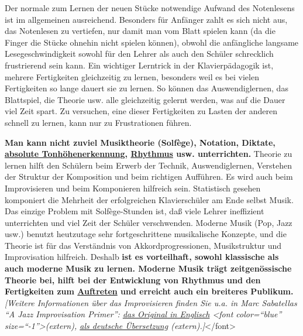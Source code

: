 Der normale zum Lernen der neuen Stücke notwendige Aufwand des Notenlesens ist im allgemeinen ausreichend.
Besonders für Anfänger zahlt es sich nicht aus, das Notenlesen zu vertiefen, nur damit man vom Blatt spielen kann (da die Finger die Stücke ohnehin nicht spielen können), obwohl die anfängliche langsame Lesegeschwindigkeit sowohl für den Lehrer als auch den Schüler schrecklich frustrierend sein kann.
Ein wichtiger Lerntrick in der Klavierpädagogik ist, mehrere Fertigkeiten gleichzeitig zu lernen, besonders weil es bei vielen Fertigkeiten so lange dauert sie zu lernen.
So können das Auswendiglernen, das Blattspiel, die Theorie usw. alle gleichzeitig gelernt werden, was auf die Dauer viel Zeit spart.
Zu versuchen, eine dieser Fertigkeiten zu Lasten der anderen schnell zu lernen, kann nur zu Frustrationen führen.

\textbf{Man kann nicht zuviel Musiktheorie (Solfège), Notation, Diktate, \hyperref[c1iii12]{absolute Tonhöhenerkennung}, \hyperref[c1iii1b]{Rhythmus} usw. unterrichten.}
Theorie zu lernen hilft den Schülern beim Erwerb der Technik, Auswendiglernen, Verstehen der Struktur der Komposition und beim richtigen Aufführen.
Es wird auch beim Improvisieren und beim Komponieren hilfreich sein.
Statistisch gesehen komponiert die Mehrheit der erfolgreichen Klavierschüler am Ende selbst Musik.
Das einzige Problem mit Solfège-Stunden ist, daß viele Lehrer ineffizient unterrichten und viel Zeit der Schüler verschwenden.
Moderne Musik (Pop, Jazz usw.) benutzt heutzutage sehr fortgeschrittene musikalische Konzepte, und die Theorie ist für das Verständnis von Akkordprogressionen, Musikstruktur und Improvisation hilfreich.
Deshalb \textbf{ist es vorteilhaft, sowohl klassische als auch moderne Musik zu lernen.
Moderne Musik trägt zeitgenössische Theorie bei, hilft bei der Entwicklung von Rhythmus und den Fertigkeiten zum \hyperref[c1iii14]{Auftreten} und erreicht auch ein breiteres Publikum.}
\label{c040119}
\textit{[Weitere Informationen über das Improvisieren finden Sie u.a. in Marc Sabatellas \enquote{A Jazz Improvisation Primer}: \hyperref[http://www.outsideshore.com/primer/primer/index.html]{das Original in Englisch} <font color=\enquote{blue} size=\enquote{-1}>(extern), \hyperref[http://msjipde.uteedgar-lins.de/index.html]{als deutsche Übersetzung} (extern).]}</font>

